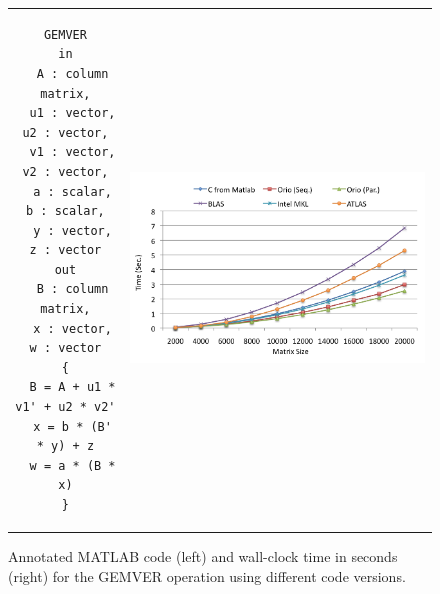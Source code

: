 \documentclass[11pt]{article}
\begin{document}
\begin{figure}[htp]
\centering
\begin{tabular}{cc}
\begin{minipage}[b]{.3\textwidth}
\footnotesize
\begin{verbatim}
GEMVER
in
  A : column matrix,
  u1 : vector, u2 : vector,
  v1 : vector, v2 : vector,
  a : scalar, b : scalar,
  y : vector, z : vector
out
  B : column matrix,
  x : vector, w : vector
{
  B = A + u1 * v1' + u2 * v2'
  x = b * (B' * y) + z
  w = a * (B * x)
}
\end{verbatim}
\end{minipage}
&
\begin{minipage}[b]{.6\textwidth}
\includegraphics[width=\textwidth]{figures/gemver.png}
\end{minipage}\\
\end{tabular}
\caption{Annotated MATLAB code (left) and wall-clock time in seconds (right) for the GEMVER operation using different code versions.}
\label{fig:gesummv}
\end{figure}

%
\end{document}
